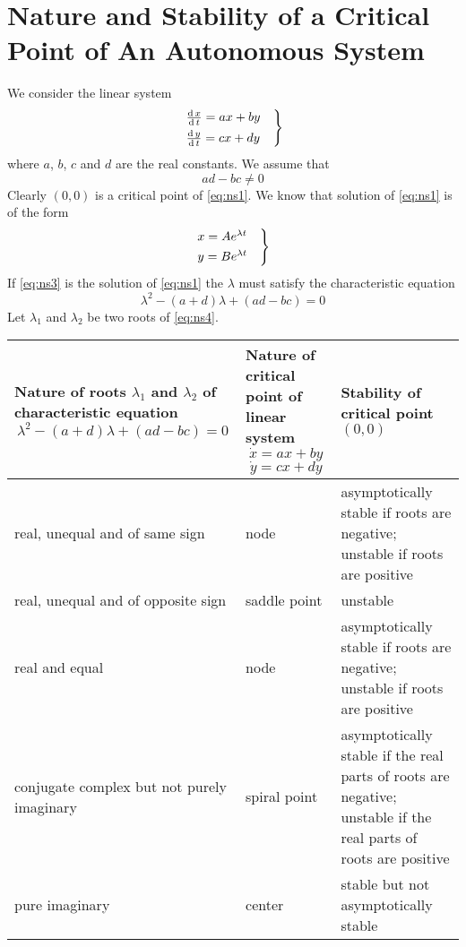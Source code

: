\documentclass[../main-sheet.tex]{subfiles}
\begin{document}
\section{Nature and Stability of a Critical Point of An Autonomous System}
We consider the linear system
\begin{equation}
    \begin{rcases}
        \,\frac{\mathrm{d}\,x}{\mathrm{d}\,t}=ax+by\quad\\
        \,\frac{\mathrm{d}\,y}{\mathrm{d}\,t}=cx+dy    
    \end{rcases}
    \label{eq:ns1}
\end{equation}
where \(a\), \(b\), \(c\) and \(d\) are the real constants. We assume that
\begin{equation}
    ad-bc\neq 0
    \label{eq:ns2}
\end{equation}
Clearly \((0,0)\) is a critical point of \eqref{eq:ns1}. We know that solution of \eqref{eq:ns1} is of the form 
\begin{equation}
    \begin{rcases}
        {x}=A e^{\lambda t}\quad\\
        {y}=B e^{\lambda t}
    \end{rcases}
    \label{eq:ns3}
\end{equation}
If \eqref{eq:ns3} is the solution of \eqref{eq:ns1} the \(\lambda\) must satisfy the characteristic equation
\begin{equation}
    \lambda^2-(a+d)\lambda+(ad-bc)=0
    \label{eq:ns4}
\end{equation}
Let \(\lambda_1\) and \(\lambda_2\) be two roots of \eqref{eq:ns4}.
\begin{table}[H]
    \centering
    \begin{tabular}{|p{}|p{}|p{}|}
        \hline
        Nature of roots \(\lambda_1\) and \(\lambda_2\) of characteristic equation
        \[\lambda^2-(a+d)\lambda+(ad-bc)=0\] & {Nature of critical point of linear system\[
            \dot{x}=ax+by\]
            \[\dot{y}=cx+dy\]} & Stability of critical point \((0,0)\)\\
        \hline
        real, unequal and of same sign & node & asymptotically stable if roots are negative; unstable if roots are positive\\\hline
        real, unequal and of opposite sign & saddle point & unstable\\\hline
        real and equal & node & asymptotically stable if roots are negative; unstable if roots are positive\\\hline
        conjugate complex but not purely imaginary & spiral point & asymptotically stable if the real parts of roots are negative; unstable if the real parts of roots are positive\\\hline
        pure imaginary & center &stable but not asymptotically stable\\\hline
    \end{tabular}
\end{table}
\end{document}
